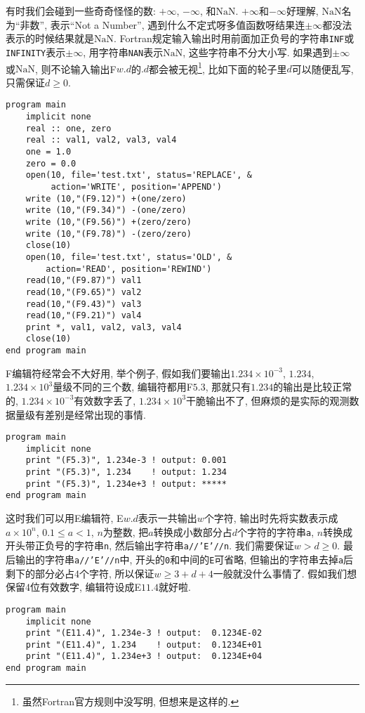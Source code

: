 有时我们会碰到一些奇奇怪怪的数: $+\infty$, $-\infty$, 和$\text{NaN}$. $+\infty$和$-\infty$好理解, $\text{NaN}$名为``非数'', 表示``Not a Number'', 遇到什么不定式呀多值函数呀结果连$\pm\infty$都没法表示的时候结果就是$\text{NaN}$. Fortran规定输入输出时用前面加正负号的字符串\texttt{INF}或\texttt{INFINITY}表示$\pm\infty$, 用字符串\texttt{NAN}表示$\text{NaN}$, 这些字符串不分大小写. 如果遇到$\pm\infty$或$\text{NaN}$, 则不论输入输出F$w.d$的$.d$都会被无视\footnote{虽然Fortran官方规则中没写明, 但想来是这样的.\label{edit_IEEE}}, 比如下面的轮子里$d$可以随便乱写, 只需保证$d\geqslant0$.
\begin{lstlisting}
program main
    implicit none
    real :: one, zero
    real :: val1, val2, val3, val4
    one = 1.0
    zero = 0.0
    open(10, file='test.txt', status='REPLACE', &
         action='WRITE', position='APPEND')
    write (10,"(F9.12)") +(one/zero)
    write (10,"(F9.34)") -(one/zero)
    write (10,"(F9.56)") +(zero/zero)
    write (10,"(F9.78)") -(zero/zero)
    close(10)
    open(10, file='test.txt', status='OLD', &
        action='READ', position='REWIND')
    read(10,"(F9.87)") val1
    read(10,"(F9.65)") val2
    read(10,"(F9.43)") val3
    read(10,"(F9.21)") val4
    print *, val1, val2, val3, val4
    close(10)
end program main
\end{lstlisting}

F编辑符经常会不大好用, 举个例子, 假如我们要输出$1.234\times10^{-3}$, $1.234$, $1.234\times10^{3}$量级不同的三个数, 编辑符都用F$5.3$, 那就只有$1.234$的输出是比较正常的, $1.234\times10^{-3}$有效数字丢了, $1.234\times10^{3}$干脆输出不了, 但麻烦的是实际的观测数据量级有差别是经常出现的事情.
\begin{lstlisting}
program main
    implicit none
    print "(F5.3)", 1.234e-3 ! output: 0.001
    print "(F5.3)", 1.234    ! output: 1.234
    print "(F5.3)", 1.234e+3 ! output: *****
end program main
\end{lstlisting}
这时我们可以用E编辑符, E$w.d$表示一共输出$w$个字符, 输出时先将实数表示成$a\times10^{n}$, $0.1\leqslant a<1$, $n$为整数, 把$a$转换成小数部分占$d$个字符的字符串\texttt{a}, $n$转换成开头带正负号的字符串\texttt{n}, 然后输出字符串\texttt{a//'E'//n}. 我们需要保证$w>d\geqslant0$. 最后输出的字符串\texttt{a//'E'//n}中, 开头的\texttt{0}和中间的\texttt{E}可省略, 但输出的字符串去掉\texttt{a}后剩下的部分必占4个字符, 所以保证$w\geqslant 3+d+4$一般就没什么事情了. 假如我们想保留4位有效数字, 编辑符设成E$11.4$就好啦.
\begin{lstlisting}
program main
    implicit none
    print "(E11.4)", 1.234e-3 ! output:  0.1234E-02
    print "(E11.4)", 1.234    ! output:  0.1234E+01
    print "(E11.4)", 1.234e+3 ! output:  0.1234E+04
end program main
\end{lstlisting}

